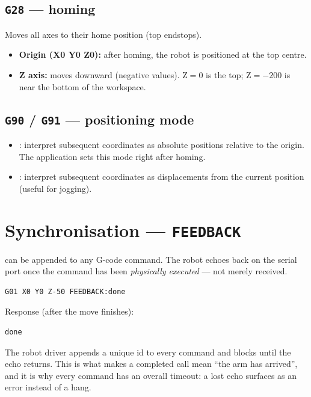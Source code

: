 \subsection{\texttt{G28} --- homing}
%
Moves all axes to their home position (top endstops).
\begin{itemize}
  \item \textbf{Origin (X0 Y0 Z0):} after homing, the robot is positioned
    at the top centre.
  \item \textbf{Z axis:} moves downward (negative values). Z$=0$ is the
    top; Z$=-200$ is near the bottom of the workspace.
\end{itemize}

\subsection{\texttt{G90} / \texttt{G91} --- positioning mode}
%
\begin{itemize}
  \item {}: interpret subsequent coordinates as absolute positions
    relative to the origin. The application sets this mode right after
    homing.
  \item {}: interpret subsequent coordinates as displacements from
    the current position (useful for jogging).
\end{itemize}

\section{Synchronisation --- \texttt{FEEDBACK}}
\label{sec:gcode-feedback}
%
 can be appended to any G-code command. The robot
echoes  back on the serial port once the command has been
\emph{physically executed} --- not merely received.

\begin{lstlisting}
G01 X0 Y0 Z-50 FEEDBACK:done
\end{lstlisting}
Response (after the move finishes):
\begin{lstlisting}
done
\end{lstlisting}

\begin{notebox}
  The robot driver appends a unique  id to every
  command and blocks until the echo returns. This is what makes a
  completed  call mean ``the arm has arrived'', and it is
  why every command has an overall timeout: a lost echo surfaces as an
  error instead of a hang.
\end{notebox}

